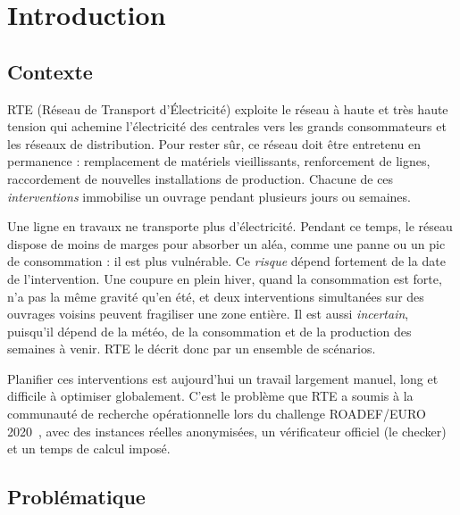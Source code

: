 \documentclass[11pt,a4paper]{report}
\begin{document}
\tableofcontents

\cleardoublepage{}
\chapter{Introduction}\label{chap:introduction}

\section{Contexte}

RTE (Réseau de Transport d'Électricité) exploite le réseau à haute et très haute tension qui achemine
l'électricité des centrales vers les grands consommateurs et les réseaux de distribution. Pour rester
sûr, ce réseau doit être entretenu en permanence : remplacement de matériels vieillissants,
renforcement de lignes, raccordement de nouvelles installations de production. Chacune de ces
\emph{interventions} immobilise un ouvrage pendant plusieurs jours ou semaines.

Une ligne en travaux ne transporte plus d'électricité. Pendant ce temps, le réseau dispose de moins
de marges pour absorber un aléa, comme une panne ou un pic de consommation : il est plus vulnérable.
Ce \emph{risque} dépend fortement de la date de l'intervention. Une coupure en plein hiver, quand la
consommation est forte, n'a pas la même gravité qu'en été, et deux interventions simultanées sur des
ouvrages voisins peuvent fragiliser une zone entière. Il est aussi \emph{incertain}, puisqu'il dépend
de la météo, de la consommation et de la production des semaines à venir. RTE le décrit donc par un
ensemble de scénarios.

Planifier ces interventions est aujourd'hui un travail largement manuel, long et difficile à
optimiser globalement. C'est le problème que RTE a soumis à la communauté de recherche
opérationnelle lors du challenge ROADEF/EURO 2020~\cite{sujet}, avec des instances réelles
anonymisées, un vérificateur officiel (le checker) et un temps de calcul imposé.

\section{Problématique}
\end{document}
